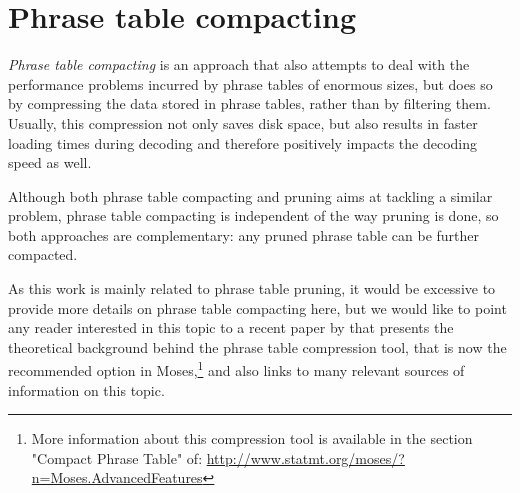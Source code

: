 \section{Phrase table compacting}

\emph{Phrase table compacting} is an approach that also attempts to deal with the performance
problems incurred by phrase tables of enormous sizes, but does so by compressing the data
stored in phrase tables, rather than by filtering them.
Usually, this compression not only saves disk space, but also results in faster loading times
during decoding and therefore positively impacts the decoding speed as well.

Although both phrase table compacting and pruning aims at tackling a similar problem, phrase
table compacting is independent of the way pruning is done, so both approaches are complementary:
any pruned phrase table can be further compacted.

As this work is mainly related to phrase table pruning, it would be excessive to provide more
details on phrase table compacting here, but we would like to point any reader interested in this
topic to a recent paper by \citet{junczys:compact} that presents the theoretical background behind
the phrase table compression tool, that is now the recommended option in Moses,\footnote{More
information about this compression tool is available in the section "Compact Phrase Table" of:
\url{http://www.statmt.org/moses/?n=Moses.AdvancedFeatures}} and also links to many relevant
sources of information on this topic.

